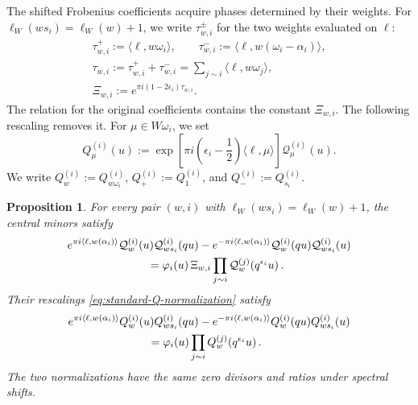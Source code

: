 \documentclass[11pt,leqno]{amsart}
\numberwithin{equation}{section}
\theoremstyle{plain}
\newtheorem{proposition}[theorem]{Proposition}
\theoremstyle{definition}
\theoremstyle{plain}
\theoremstyle{definition}
\theoremstyle{remark}
\begin{document}
The shifted Frobenius coefficients acquire phases determined by their weights. For $\ell_W(ws_i)=\ell_W(w)+1$, we write $\tau_{w,i}^{\pm}$ for the two weights evaluated on $\ell$:
\begin{equation}\label{eq:central-minor-Xi}
 \begin{gathered}
 \tau_{w,i}^{+}:=\langle\ell,w\omega_i\rangle,
 \qquad
 \tau_{w,i}^{-}:=\langle\ell,w(\omega_i-\alpha_i)\rangle,\\
 \tau_{w,i}:=\tau_{w,i}^{+}+\tau_{w,i}^{-}
 =\sum_{j\sim i}\langle\ell,w\omega_j\rangle,\\
 \Xi_{w,i}:=e^{\pi i(1-2\epsilon_i)\tau_{w,i}}.
 \end{gathered}
\end{equation}
The relation for the original coefficients contains the constant $\Xi_{w,i}$. The following rescaling removes it. For $\mu\in W\omega_i$, we set
\begin{equation}\label{eq:standard-Q-normalization}
 Q_{\mu}^{(i)}(u)
 :=\exp\!\left[\pi i\left(\epsilon_i-\frac12\right)
                    \langle\ell,\mu\rangle\right]\mathcal Q_{\mu}^{(i)}(u).
\end{equation}
We write $Q_w^{(i)}:=Q_{w\omega_i}^{(i)}$, $Q_+^{(i)}:=Q_1^{(i)}$, and $Q_-^{(i)}:=Q_{s_i}^{(i)}$.

\begin{proposition}\label{prop:central-minor-QQ}\label{prop:standard-QQ-normalization}
For every pair $(w,i)$ with $\ell_W(ws_i)=\ell_W(w)+1$, the central minors satisfy
\begin{equation}\label{eq:central-minor-QQ}
\begin{aligned}
 &e^{\pi i\langle\ell,w(\alpha_i)\rangle}
  \mathcal Q_w^{(i)}(u)\mathcal Q_{ws_i}^{(i)}(qu)
 -e^{-\pi i\langle\ell,w(\alpha_i)\rangle}
  \mathcal Q_w^{(i)}(qu)\mathcal Q_{ws_i}^{(i)}(u)\\
 &\hspace{25mm}=
 \varphi_i(u)\,\Xi_{w,i}
 \prod_{j\sim i}\mathcal Q_w^{(j)}\!\left(q^{\epsilon_i}u\right).
\end{aligned}
\end{equation}
Their rescalings \eqref{eq:standard-Q-normalization} satisfy
\begin{equation}\label{eq:exact-QQ}
\begin{aligned}
 &e^{\pi i\langle\ell,w(\alpha_i)\rangle}
  Q_w^{(i)}(u)Q_{ws_i}^{(i)}(qu)
 -e^{-\pi i\langle\ell,w(\alpha_i)\rangle}
  Q_w^{(i)}(qu)Q_{ws_i}^{(i)}(u)\\
 &\hspace{25mm}=
 \varphi_i(u)
 \prod_{j\sim i}Q_w^{(j)}\!\left(q^{\epsilon_i}u\right).
\end{aligned}
\end{equation}
The two normalizations have the same zero divisors and ratios under spectral shifts.
\end{proposition}
\end{document}
